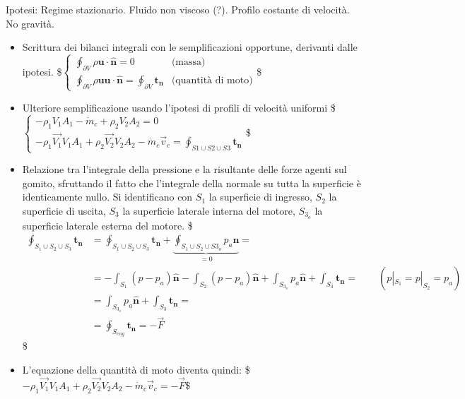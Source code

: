 \documentclass[letterpaper,10pt,italian]{jupyterBook}
\begin{document}
\sphinxAtStartPar
Ipotesi: Regime stazionario. Fluido non viscoso (?). Profilo costante di
velocità. No gravità.
\begin{itemize}
\item {} 
\sphinxAtStartPar
Scrittura dei bilanci integrali con le semplificazioni opportune,
derivanti dalle ipotesi. \$\(\begin{cases}
      \oint_{\partial V} \rho \bm{u} \cdot \hat{\bm{n}} = 0  & \text{(massa)} \\
      \oint_{\partial V} \rho \bm{u} \bm{u} \cdot \hat{\bm{n}} = \oint_{\partial V} \bm{t_n} & \text{(quantità di moto)}
     \end{cases}\)\$

\item {} 
\sphinxAtStartPar
Ulteriore semplificazione usando l’ipotesi di profili di velocità
uniformi \$\(\begin{cases}
      - \rho_1 V_1 A_1 -\dot{m}_c + \rho_2 V_2 A_2 = 0  \\
      - \rho_1 \vec{V_1} V_1 A_1 + \rho_2 \vec{V_2} V_2 A_2 - \dot{m}_c \vec{v}_c = \oint_{S1\cup S2\cup S3} \bm{t_n}
     \end{cases}\)\$

\item {} 
\sphinxAtStartPar
Relazione tra l’integrale della pressione e la risultante delle
forze agenti sul gomito, sfruttando il fatto che l’integrale della
normale su tutta la superficie è identicamente nullo. Si
identificano con \(S_1\) la superficie di ingresso, \(S_2\) la
superficie di uscita, \(S_3\) la superficie laterale interna del
motore, \(S_{3_o}\) la superficie laterale esterna del motore.
\$\(\begin{aligned}
      \displaystyle\oint_{S_1\cup S_2\cup S_3} \bm{t_n} & = \displaystyle\oint_{S_1\cup S_2\cup S_3} \bm{t_n} + \underbrace{\displaystyle\oint_{S_1\cup S_2\cup S{3_o}} p_a \hat{\bm{n}}}_{=0} = \\
      & = -\int_{S_1} (p-p_a) \hat{\bm{n}} - \int_{S_2} (p-p_a) \hat{\bm{n}} + \int_{S_{3_o}} p_a \hat{\bm{n}} + \int_{S_3} \bm{t_n}  = \qquad(p|_{S_1} = p|_{S_2} = p_a) \\
      & = \int_{S_{3_o}} p_a \hat{\bm{n}} + \int_{S_3} \bm{t_n} = \\
      & = \oint_{S_{eng}} \bm{t_n} = - \vec{F}
     \end{aligned}\)\$

\item {} 
\sphinxAtStartPar
L’equazione della quantità di moto diventa quindi:
\$\(- \rho_1 \vec{V_1} V_1 A_1 + \rho_2 \vec{V_2} V_2 A_2 - \dot{m}_c \vec{v}_c = - \vec{F}\)\$


\end{itemize}
\end{document}

